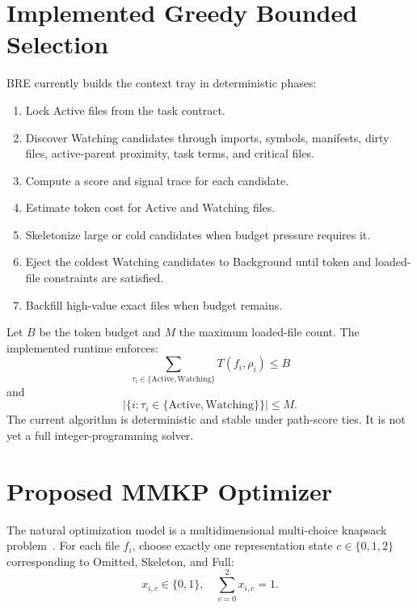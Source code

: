 \documentclass[11pt,onecolumn]{article}
\begin{document}
\section{Implemented Greedy Bounded Selection}
BRE currently builds the context tray in deterministic phases:
\begin{enumerate}
    \item Lock Active files from the task contract.
    \item Discover Watching candidates through imports, symbols, manifests, dirty files, active-parent proximity, task terms, and critical files.
    \item Compute a score and signal trace for each candidate.
    \item Estimate token cost for Active and Watching files.
    \item Skeletonize large or cold candidates when budget pressure requires it.
    \item Eject the coldest Watching candidates to Background until token and loaded-file constraints are satisfied.
    \item Backfill high-value exact files when budget remains.
\end{enumerate}

Let $B$ be the token budget and $M$ the maximum loaded-file count. The implemented runtime enforces:
\begin{equation}
\sum_{\tau_i \in \{\mathrm{Active},\mathrm{Watching}\}} T(f_i,\rho_i) \le B
\end{equation}
and
\begin{equation}
|\{i : \tau_i \in \{\mathrm{Active},\mathrm{Watching}\}\}| \le M.
\end{equation}
The current algorithm is deterministic and stable under path-score ties. It is not yet a full integer-programming solver.

\section{Proposed MMKP Optimizer}
The natural optimization model is a multidimensional multi-choice knapsack problem~\cite{akbar2001heuristic}. For each file $f_i$, choose exactly one representation state $c \in \{0,1,2\}$ corresponding to Omitted, Skeleton, and Full:
\begin{equation}
x_{i,c} \in \{0,1\}, \quad \sum_{c=0}^{2} x_{i,c}=1.
\end{equation}
\end{document}
